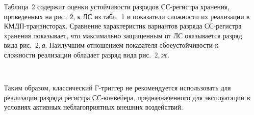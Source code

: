 \begin{multicols}{2}
  Таблица~2 содержит оценки устойчивости разрядов СС-ре\-гист\-ра 
хранения, приведенных на рис.~2, к ЛС из табл.~1 и показатели сложности их 
реализации  
в КМДП-тран\-зис\-то\-рах. Сравнение характеристик вариантов разряда СС-ре\-гист\-ра хранения показывает, что максимально защищенным от ЛС 
оказывается разряд вида рис.~2,\,\textit{а}. Наилучшим отношением показателя 
сбоеустойчивости к сложности реализации обладает разряд вида рис.~2,\,\textit{ж}.
  
\begin{figure*} %
\vspace*{1pt}
    \begin{center}  
  \mbox{%
 \epsfxsize=157.389mm 
 }
\end{center}
\vspace*{-11pt}
  \end{figure*}

  Таким образом, классический Г-триг\-гер не рекомендуется использовать 
для реализации разряда регистра СС-кон\-вей\-ера, предназначенного для 
эксплуатации в условиях активных неблагоприятных внешних воздействий.

\begin{figure*} %
\vspace*{1pt}
    \begin{center}  
  \mbox{%
 \epsfxsize=117.113mm 
 }
\end{center}
\vspace*{-11pt}
\vspace*{-8pt}
\end{figure*}

\setcounter{table}{1}
\begin{table*}\small %
\begin{center}
\parbox{100mm}{
}

\vspace*{2ex}


\end{center}
\end{table*}
\end{multicols}
